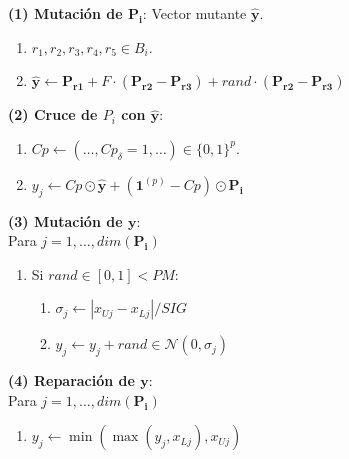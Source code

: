 \begin{minipage}{\textwidth}
\begin{algorithm}[H]
    \begin{multicols}{2}
     \vspace{0.2cm} \textbf{(1) Mutación de $\boldsymbol{P_i}$}: Vector mutante $\boldsymbol{\hat{y}}$.
            \begin{enumerate}
                \item $r_1, r_2, r_3, r_4, r_5 \in B_i$.
                \item $\boldsymbol{\hat{y}} \gets \boldsymbol{P_{r1}} + F \cdot (\boldsymbol{P_{r2}} - \boldsymbol{P_{r3}}) + rand \cdot (\boldsymbol{P_{r2}} - \boldsymbol{P_{r3}}) $
            \end{enumerate}
            
     \vspace{0.2cm} \textbf{(2) Cruce de $P_i$ con $\boldsymbol{\hat{y}}$}: 
            \begin{enumerate}
                \item $Cp \gets (\dots,  Cp_\delta=1, \dots) \in \{0,1\}^{p}$.
                \item $y_j \gets Cp \odot \boldsymbol{\hat{y}} +  (\boldsymbol{1}^{(p)} - Cp) \odot \boldsymbol{P_i}
                 $
            \end{enumerate}
            
    \end{multicols}
        
    \begin{multicols}{2}
    \vspace{0.2cm} \textbf{(3) Mutación de $\boldsymbol{y}$}:\\
    Para $j = 1, \dots, dim(\boldsymbol{P_i})$\\
            \begin{enumerate}
                \item Si $rand \in [0,1] < PM $: 
                \begin{enumerate}
                    \item $\sigma_j \gets |x_{Uj} - x_{Lj}|/SIG$
                    \item $y_j \gets y_j + rand \in \mathcal{N}(0, \sigma_j)$ 
                \end{enumerate}
            \end{enumerate}\columnbreak
            
        \vspace{0.2cm} \textbf{(4) Reparación de $\boldsymbol{y}$}: \\
        Para $j = 1, \dots, dim(\boldsymbol{P_i})$\\
            \begin{enumerate}
                \item $y_j \gets \min ( \max ( y_j , x_{Lj}), x_{Uj})$
            \end{enumerate}
    \end{multicols}
       

\end{algorithm}
\end{minipage}
